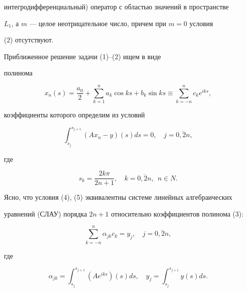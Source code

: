 интегродифференциальный) оператор с областью значений в пространстве


$L_{1}$, а $m$ --- целое неотрицательное число, причем при $m=0$ условия


(2) отсутствуют.





Приближенное решение задачи (1)--(2) ищем в виде


полинома


\begin{equation}


x_n(s)=\frac{a_{0}}{2} + \sum_{k=1}^n a_k \cos ks + b_k \sin ks


\equiv \sum_{k=-n}^n c_k e^{iks},


\end{equation}


коэффициенты которого определим из условий


\begin{equation}


\int_{s_j}^{s_{j+1}} (Ax_n - y)(s) ds=0, \quad j=\overline{0, 2n},


\end{equation}


где


\begin{equation}


s_k=\frac{2k \pi}{2n+1}, \quad k=\overline{0, 2n}, \ \ n \in N.


\end{equation}





Ясно, что условия (4), (5) эквивалентны системе линейных алгебраических


уравнений (СЛАУ) порядка $ 2n+1 $ относительно коэффициентов полинома (3):


\begin{equation}


\sum_{k=-n}^n \alpha_{jk} c_k=y_j, \quad j=\overline{0, 2n},


\end{equation}


где


$$


\alpha_{jk}=\int_{s_j}^{s_{j+1}} (Ae^{iks})(s) ds, \quad y_j=\int_{s_j}^


{s_{j+1}} y(s) ds.


$$








